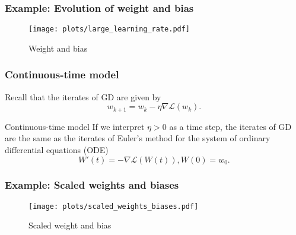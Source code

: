 \documentclass[17pt,institute=e10]{tuhh_presentation}
\newcommand{\CL}{\mathcal{L}}
\begin{document}
\begin{frame}[fragile]
  \frametitle{Example: Evolution of weight and bias}
    \vspace{-1cm}
    \begin{figure}
      \centering
      \texttt{[image: plots/large\_learning\_rate.pdf]}
      \caption{Weight and bias}
    \end{figure}
\end{frame}

\begin{frame}[fragile]
  \frametitle{Continuous-time model}
  Recall that the iterates of GD are given by
  \begin{equation*}
    w_{k+1} = w_k - \eta \nabla \CL(w_k).
  \end{equation*}
  \begin{block}{Continuous-time model}
    If we interpret $\eta > 0$ as a time step, the iterates of GD are the same as the iterates of Euler's method for the system of ordinary differential equations (ODE)
  \begin{equation*}
    W'(t) = - \nabla \CL(W(t)), W(0) = w_0.
  \end{equation*} 
  \end{block}
  
\end{frame}

\begin{frame}[fragile]
  \frametitle{Example: Scaled weights and biases}
    \vspace{-1cm}
    \begin{figure}
      \centering
      \texttt{[image: plots/scaled\_weights\_biases.pdf]}
      \caption{Scaled weight and bias}
    \end{figure}
\end{frame}
\end{document}
